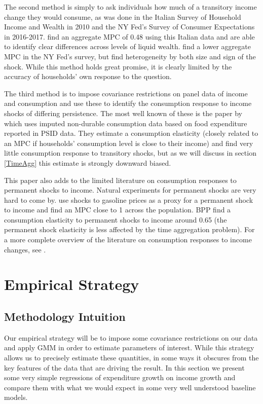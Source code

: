 \documentclass[titlepage]{\econtex}\newcommand{\texname}{ConsumptionHeterogeneity}
\begin{document}
The second method is simply to ask individuals how much of a transitory income change they would consume, as was done in the Italian Survey of Household Income and Wealth in 2010 and the NY Fed's Survey of Consumer
Expectations in 2016-2017. \cite{jappelli_fiscal_2014} find an aggregate MPC of 0.48 using this Italian data and are able to identify clear differences across levels of liquid wealth. \cite{fuster_what_2018} find a lower aggregate MPC in the NY Fed's survey, but find heterogeneity by both size and sign of the shock. While this method holds great promise, it is clearly limited by the accuracy of households' own response to the question.

The third method is to impose covariance restrictions on panel data of income and consumption and use these to identify the consumption response to income shocks of differing persistence. The most well known of these is the paper by \cite{blundell_consumption_2008} which uses imputed non-durable consumption data based on food expenditure reported in PSID data. They estimate a consumption elasticity (closely related to an MPC if households' consumption level is close to their income) and find very little consumption response to transitory shocks, but as we will discuss in section \ref{TimeAgg} this estimate is strongly downward biased.

This paper also adds to the limited literature on consumption responses to permanent shocks to income. Natural experiments for permanent shocks are very hard to come by. \cite{gelman_response_2016} use shocks to gasoline prices as a proxy for a permanent shock to income and find an MPC close to 1 across the population. BPP find a consumption elasticity to permanent shocks to income around 0.65 (the permanent shock elasticity is less affected by the time aggregation problem). For a more complete overview of the literature on consumption responses to income changes, see \cite{jappelli_consumption_2010}.

\section{Empirical Strategy} \label{empirical_strategy} 

\subsection{Methodology Intuition}
Our empirical strategy will be to impose some covariance restrictions on our data and apply GMM in order to estimate parameters of interest. While this strategy allows us to precisely estimate these quantities, in some ways it obscures from the key features of the data that are driving the result. In this section we present some very simple regressions of expenditure growth on income growth and compare them with what we would expect in some very well understood baseline models.
\end{document}
